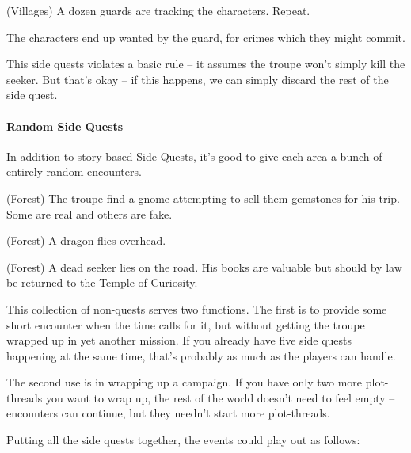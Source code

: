 \begin{multicols}{2}
\begin{exampletext}
\begin{list}{\sqn}{}
  \item
  (Villages) A dozen guards are tracking the characters. Repeat.

\end{list}

The characters end up wanted by the \gls{guard}, for crimes which they might commit.

\end{exampletext}

This side quests violates a basic rule -- it assumes the troupe won't simply kill the \gls{seeker}.
But that's okay  -- if this happens, we can simply discard the rest of the side quest.

\paragraph{Random Side Quests}

In addition to story-based Side Quests, it's good to give each area a bunch of entirely random encounters.

\begin{list}{\sqn}{}

  \item{(Forest) The troupe find a gnome attempting to sell them gemstones for his trip. Some are real and others are fake.}

  \item{(Forest) A dragon flies overhead.}

  \item
  (Forest) A dead \gls{seeker} lies on the road.
  His books are valuable but should by law be returned to the Temple of Curiosity.

\end{list}

\noindent
This collection of non-quests serves two functions.
The first is to provide some short encounter when the time calls for it, but without getting the troupe wrapped up in yet another mission.
If you already have five side quests happening at the same time, that's probably as much as the players can handle.

The second use is in wrapping up a campaign.
If you have only two more plot-threads you want to wrap up, the rest of the world doesn't need to feel empty -- encounters can continue, but they needn't start more plot-threads.

Putting all the side quests together, the events could play out as follows:


\end{multicols}
